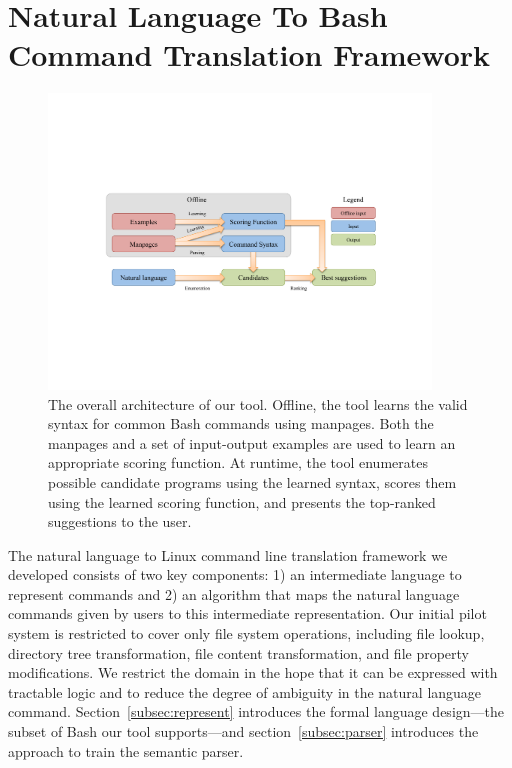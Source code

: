 \section{Natural Language To Bash Command Translation Framework}
\label{sec:framework}

\begin{figure}[h]
    \begin{center} \includegraphics[width=4in]{architecture.pdf} \end{center}
    \caption{The overall architecture of our tool. Offline, the tool learns the
        valid syntax for common Bash commands using manpages. Both the manpages
        and a set of input-output examples are used to learn an appropriate
        scoring function. At runtime, the tool enumerates possible candidate
        programs using the learned syntax, scores them using the learned scoring
        function, and presents the top-ranked suggestions to the user.}
    \label{fig:arch}
\end{figure}

The natural language to Linux command line translation framework we developed consists of two key components: 
1) an intermediate language to represent commands and
2) an algorithm that maps the natural language commands given by users to this intermediate representation. Our initial pilot system is restricted to cover only file system operations, including file lookup, directory tree transformation, file content transformation, and file property modifications. We restrict the domain in the hope that it can be expressed with tractable logic and to reduce the degree of ambiguity in the natural language command. Section~\ref{subsec:represent} introduces the formal language design---the subset of Bash our tool supports---and section~\ref{subsec:parser} introduces the approach to train the semantic parser.



